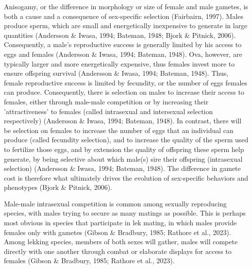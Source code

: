 \documentclass[12pt,reqno,oneside]{report}
\begin{document}
Anisogamy, or the difference in morphology or size of female and male gametes, is both a cause and a consequence of sex-specific selection (Fairbairn, 1997). Males produce sperm, which are small and energetically inexpensive to generate in large quantities (Andersson \& Iwasa, 1994; Bateman, 1948; Bjork \& Pitnick, 2006). Consequently, a male's reproductive success is generally limited by his access to eggs and females (Andersson \& Iwasa, 1994; Bateman, 1948). Ova, however, are typically larger and more energetically expensive, thus females invest more to ensure offspring survival (Andersson \& Iwasa, 1994; Bateman, 1948). Thus, female reproductive success is limited by fecundity, or the number of eggs females can produce. Consequently, there is selection on males to increase their access to females, either through male-male competition or by increasing their 'attractiveness' to females (called intrasexual and intersexual selection respectively) (Andersson \& Iwasa, 1994; Bateman, 1948). In contrast, there will be selection on females to increase the number of eggs that an individual can produce (called fecundity selection), and to increase the quality of the sperm used to fertilize those eggs, and by extension the quality of offspring these sperm help generate, by being selective about which male(s) sire their offspring (intrasexual selection) (Andersson \& Iwasa, 1994; Bateman, 1948). The difference in gamete cost is therefore what ultimately drives the evolution of sex-specific behaviors and phenotypes (Bjork \& Pitnick, 2006).

Male-male intrasexual competition is common among sexually reproducing species, with males trying to secure as many matings as possible. This is perhaps most obvious in species that participate in lek mating, in which males provide females only with gametes (Gibson \& Bradbury, 1985; Rathore et al., 2023). Among lekking species, members of both sexes will gather, males will compete directly with one another through combat or elaborate displays for access to females (Gibson \& Bradbury, 1985; Rathore et al., 2023).
\end{document}
